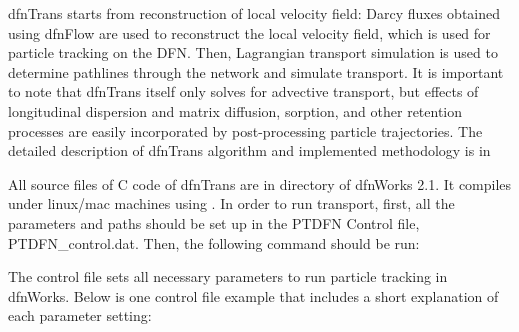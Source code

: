 \documentclass[letterpaper,10pt,english]{sphinxmanual}
\begin{document}
dfnTrans starts from  reconstruction of local velocity field: Darcy fluxes
obtained using dfnFlow are used to reconstruct the local velocity field, which
is used for particle tracking on the DFN. Then, Lagrangian transport simulation
is used to determine pathlines through the network and simulate transport. It is
important to note that dfnTrans itself only solves for advective transport, but
effects of longitudinal dispersion and matrix diffusion, sorption, and other
retention processes are easily incorporated by post-processing particle
trajectories. The detailed description of dfnTrans algorithm and implemented
methodology is in 

All source files of C code of dfnTrans are in  directory of
dfnWorks 2.1. It compiles under linux/mac machines using .  In order
to run transport, first, all the parameters and paths should be set up in the
PTDFN Control file, PTDFN\_control.dat. Then, the following command should be
run:


The control  file sets all necessary parameters to run particle tracking in
dfnWorks.  Below is one control file example that includes a short
explanation of each parameter setting:
\end{document}
